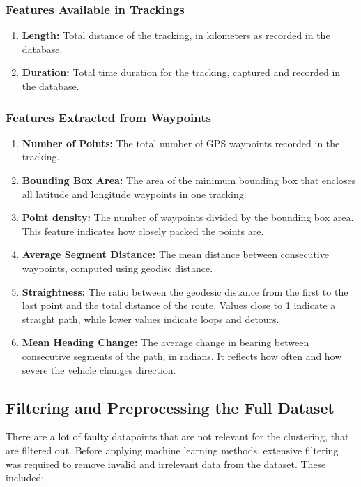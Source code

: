 \documentclass[a4paper,12pt,twoside]{scrreprt}
\begin{document}
\subsubsection{Features Available in Trackings}

\begin{enumerate}
  \item \textbf{Length:} Total distance of the tracking, in kilometers as
        recorded in the database.
  \item \textbf{Duration:} Total time duration for the tracking, captured and
        recorded in the database.
\end{enumerate}

\subsubsection{Features Extracted from Waypoints}

\begin{enumerate}
  \item \textbf{Number of Points:} The total number of GPS waypoints recorded
        in the tracking.
  \item \textbf{Bounding Box Area:} The area of the minimum bounding box that
        encloses all latitude and longitude waypoints in one tracking.
  \item \textbf{Point density:} The number of waypoints divided by the bounding
        box area. This feature indicates how closely packed the points are.
  \item \textbf{Average Segment Distance:} The mean distance between
        consecutive waypoints, computed using geodisc distance.
  \item \textbf{Straightness:} The ratio between the geodesic distance from the
        first to the last point and the total distance of the route. Values
        close to 1
        indicate a straight path, while lower values indicate loops and
        detours.
  \item \textbf{Mean Heading Change:} The average change in bearing between
        consecutive segments of the path, in radians. It reflects how often and
        how
        severe the vehicle changes direction.
\end{enumerate}

\subsection{Filtering and Preprocessing the Full Dataset}
There are a lot of faulty datapoints that are not relevant for the
clustering, that are filtered out. Before applying machine learning methods,
extensive filtering was required to
remove invalid and irrelevant data from the dataset. These included:
\end{document}
